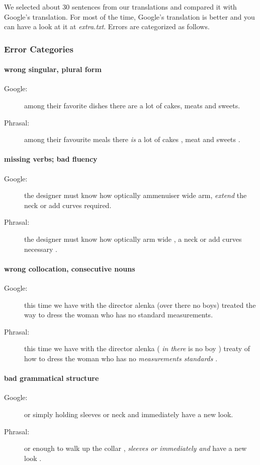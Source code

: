 \documentclass{article}
\begin{document}
We selected about 30 sentences from our translations and compared it with Google's translation. For most of the time, Google's translation is better and you can have a look at it at \textit{extra.txt}. Errors are categorized as follows.

\subsubsection{Error Categories}

\paragraph{wrong singular, plural form}
\begin{description}
\item[Google:] among their favorite dishes there are a lot of cakes, meats and sweets.
\item[Phrasal:] among their favourite meals there \textit{is} a lot of cakes , meat and sweets .
\end{description}

\paragraph{missing verbs; bad fluency}
\begin{description}
\item[Google:] the designer must know how optically ammenuiser wide arm, \textit{extend} the neck or add curves required.
\item[Phrasal:] the designer must know how optically arm wide , a neck or add curves necessary .
\end{description}

\paragraph{wrong collocation, consecutive nouns}
\begin{description}
\item[Google:] this time we have with the director alenka (over there no boys) treated the way to dress the woman who has no standard measurements.
\item[Phrasal:] this time we have with the director alenka ( \textit{in there} is no boy ) treaty of how to dress the woman who has no \textit{measurements standards} .
\end{description}

\paragraph{bad grammatical structure}
\begin{description}
\item[Google:] or simply holding sleeves or neck and immediately have a new look.
\item[Phrasal:] or enough to walk up the collar , \textit{sleeves or immediately and} have a new look .
\end{description}
\end{document}
